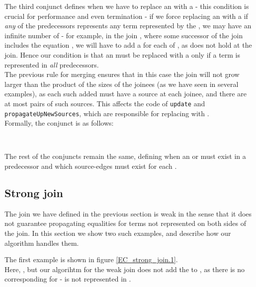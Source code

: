 \noindent
The third conjunct defines when we have to replace an \RGFA{} with a \GT{} - this condition is crucial for performance and even termination - if we force replacing an \RGFA{} with a \GT{} if \emph{any} of the predecessors represents any term represented by the \RGFA{}, we may have an infinite number of \GTs{} - for example, in the join , where some successor of the join includes the equation , we will have to add a \GT{} for each of , as  does not hold at the join. 
Hence our condition is that an \RGFA{} must be replaced with a \GT{} only if a term is represented in \emph{all} predecessors.\\
The previous rule for merging \GTs{} ensures that in this case the join will not grow larger than the product of the sizes of the joinees (as we have seen in several examples), as each such added \GT{} must have a source at each joinee, and there are at most  pairs of such sources. This affects the code of \lstinline|update| and \lstinline|propagateUpNewSources|, which are responsible for replacing \RGFAs{} with \GTs{}.\\
Formally, the conjunct is as follows:
\begin{figure}[H]
\\
\end{figure}

The rest of the conjuncts remain the same, defining when an \RGFA{} or \GFA{} must exist in a predecessor and which source-edges must exist for each \GT{}.

\subsection{Strong join}
The join we have defined in the previous section is weak in the sense that it does not guarantee propagating equalities for terms not represented on both sides of the join. In this section we show two such examples, and describe how our algorithm handles them.


\bigskip
\noindent
The first example is shown in figure \ref{EC_strong_join.1}.\\
Here, , but our algorihtm for the weak join does not add the \GFA{}  to , as there is no corresponding \GFA{} for  -  is not represented in .

